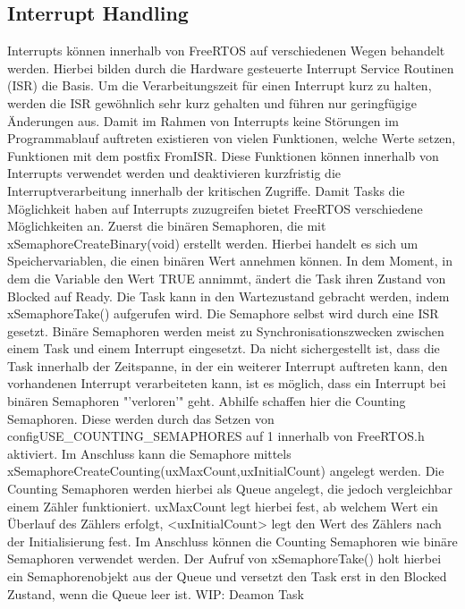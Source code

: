 \subsection{Interrupt Handling}
\label{sec:Interrupt}
Interrupts können innerhalb von FreeRTOS auf verschiedenen Wegen behandelt werden. Hierbei bilden durch die Hardware gesteuerte Interrupt Service Routinen (ISR) die Basis. Um die Verarbeitungszeit für einen Interrupt kurz zu halten, werden die ISR gewöhnlich sehr kurz gehalten und führen nur geringfügige Änderungen aus. Damit im Rahmen von Interrupts keine Störungen im Programmablauf auftreten existieren von vielen Funktionen, welche Werte setzen, Funktionen mit dem postfix FromISR. Diese Funktionen können innerhalb von Interrupts verwendet werden und deaktivieren kurzfristig die Interruptverarbeitung innerhalb der kritischen Zugriffe.
Damit Tasks die Möglichkeit haben auf Interrupts zuzugreifen bietet FreeRTOS verschiedene Möglichkeiten an. Zuerst die binären Semaphoren, die mit xSemaphoreCreateBinary(void) erstellt werden. Hierbei handelt es sich um Speichervariablen, die einen binären Wert annehmen können. In dem Moment, in dem die Variable den Wert TRUE annimmt, ändert die Task ihren Zustand von Blocked auf Ready. Die Task kann in den Wartezustand gebracht werden, indem xSemaphoreTake() aufgerufen wird. Die Semaphore selbst wird durch eine ISR gesetzt. Binäre Semaphoren werden meist zu Synchronisationszwecken zwischen einem Task und einem Interrupt eingesetzt.
Da nicht sichergestellt ist, dass die Task innerhalb der Zeitspanne, in der ein weiterer Interrupt auftreten kann, den vorhandenen Interrupt verarbeiteten kann, ist es möglich, dass ein Interrupt bei binären Semaphoren "'verloren'" geht. Abhilfe schaffen hier die Counting Semaphoren. Diese werden durch das Setzen von configUSE\_COUNTING\_SEMAPHORES auf 1 innerhalb von FreeRTOS.h aktiviert. Im Anschluss kann die Semaphore mittels xSemaphoreCreateCounting(uxMaxCount,uxInitialCount) angelegt werden. Die Counting Semaphoren werden hierbei als Queue angelegt, die jedoch vergleichbar einem Zähler funktioniert. uxMaxCount legt hierbei fest, ab welchem Wert ein Überlauf des Zählers erfolgt, <uxInitialCount> legt den Wert des Zählers nach der Initialisierung fest. Im Anschluss können die Counting Semaphoren wie binäre Semaphoren verwendet werden. Der Aufruf von xSemaphoreTake() holt hierbei ein Semaphorenobjekt aus der Queue und versetzt den Task erst in den Blocked Zustand, wenn die Queue leer ist.
WIP: Deamon Task
